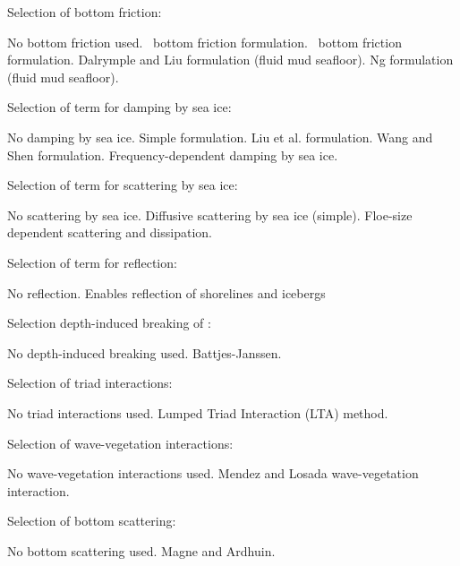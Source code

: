 \noindent
Selection of bottom friction:
\begin{slist}
 {No bottom friction used.}
 {\js\ bottom friction formulation.}
 {\showex\ bottom friction formulation.}
 {Dalrymple and Liu formulation (fluid mud seafloor).}
 {Ng formulation (fluid mud seafloor).}
\end{slist}

\noindent
Selection of term for damping by sea ice:
\begin{slist}
 {No damping by sea ice.}
 {Simple formulation.}
 {Liu et al. formulation.}
 {Wang and Shen formulation.}
 {Frequency-dependent damping by sea ice.}
\end{slist}

\noindent
Selection of term for scattering by sea ice:
\begin{slist}
 {No scattering by sea ice.}
 {Diffusive scattering by sea ice (simple).}
 {Floe-size dependent scattering and dissipation.}
\end{slist}

\noindent
Selection of term for reflection:
\begin{slist}
 {No reflection.}
 {Enables reflection of shorelines and icebergs}
\end{slist}

\noindent
Selection depth-induced breaking of :
\begin{slist}
 {No depth-induced breaking used.}
 {Battjes-Janssen.}
\end{slist}

\noindent
Selection of triad interactions:
\begin{slist}
 {No triad interactions used.}
 {Lumped Triad Interaction (LTA) method.}
\end{slist}

\noindent
Selection of wave-vegetation interactions:
\begin{slist}
 {No wave-vegetation interactions used.}
 {Mendez and Losada wave-vegetation interaction.}
\end{slist}

\noindent
Selection of bottom scattering:
\begin{slist}
 {No bottom scattering used.}
 {Magne and Ardhuin.}
\end{slist}

